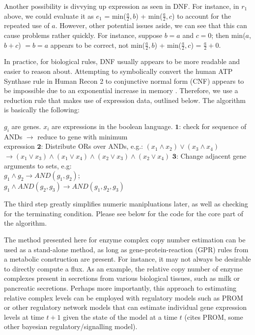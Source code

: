 \documentclass[phd,tocprelim]{cornell}
\begin{document}
Another possibility is divvying up expression as seen in DNF. For instance, in $r_1$ above,
we could evaluate it as $e_1$ = min($\frac{a}{2},b$) + min($\frac{a}{2},c$) to account for
the repeated use of $a$. However, other potential issues aside, we can see that this can
cause problems rather quickly. For instance, suppose $b = a$ and $c = 0$; then min($a$,$b+c$) 
$=b=a$ appears to be correct, not min($\frac{a}{2},b$) + min($\frac{a}{2},c$) = $\frac{a}{2} + 0$. 

In practice, for biological rules, DNF usually appears to be more readable and easier to reason about.
Attempting to symbolically convert the human ATP Synthase rule in Human Recon 2 to conjunctive normal form (CNF) 
appears to be impossible due to an exponential increase in memory \cite{Thiele2013}. Therefore, we use a reduction rule
that makes use of expression data, outlined below. The algorithm is basically the following:  \\

\begin{algorithmic}
\REQUIRE $g_i$ are genes. 
\REQUIRE $x_i$ are expressions in the boolean language.
  \STATE $\mathbf{1}$: check for sequence of ANDs $\rightarrow$ reduce to gene with minimum \\
    \hspace{4.8 mm} expression 
  \STATE $\mathbf{2}$: Distribute ORs over ANDs, e.g.: $(x_1 \land x_2) \lor (x_3 \land x_4)$ \\ 
    \hspace{4.8 mm} $\rightarrow (x_1 \lor x_3) \land (x_1 \lor x_4) \land (x_2 \lor x_3) \land (x_2 \lor x_4)$
  \STATE $\mathbf{3}$: Change adjacent gene arguments to sets, e.g: \\
    \hspace{4.8 mm} $g_1 \land g_2 \rightarrow AND(g_1,g_2)$;  \\
    \hspace{4.8 mm} $g_1 \land AND(g_2,g_3) \rightarrow AND(g_1,g_2,g_3)$ 
\ENDWHILE
\end{algorithmic} 
\vspace{5 mm} 
The third step greatly simplifies numeric manipluations later, as well as checking for
the terminating condition.
Please see below for the code for the core part of the algorithm.

The method presented here for enzyme complex copy number estimation can be used as a stand-alone method,
as long as gene-protein-reaction (GPR) rules from a metabolic construction are present. For instance, it 
may not always be desirable to directly compute a flux. As an example, the relative copy number of
enzyme complexes present in secretions from various biological tissues, such as milk or pancreatic
secretions. Perhaps more importantly, this approach to estimating relative complex levels can be employed
with regulatory models such as PROM or other regulatory network models that can estimate individual gene
expression levels at time $t+1$ given the state of the model at a time $t$ (cites PROM, some other bayesian
regulatory/signalling model).
\end{document}
